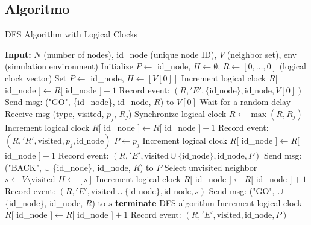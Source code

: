\subsection{Algoritmo}

\begin{algorithm}
\caption{DFS Algorithm with Logical Clocks}
\begin{algorithmic}[1]
    \State \textbf{Input:} $N$ (number of nodes), id\_node (unique node ID), $V$ (neighbor set), env (simulation environment)
    \State Initialize $P \leftarrow$ id\_node, $H \leftarrow \emptyset$, $R \leftarrow [0, \ldots, 0]$ (logical clock vector)
     
        \State Set $P \leftarrow$ id\_node, $H \leftarrow [V[0]]$
        \State Increment logical clock $R[$ id\_node $] \leftarrow R[$ id\_node $] + 1$
        \State Record event: $(R, 'E', \{ \text{id\_node} \}, \text{id\_node}, V[0])$
        \State Send msg: ("GO", \{id\_node\}, id\_node, $R$) to $V[0]$
    \EndIf
        \State Wait for a random delay
        \State Receive msg (type, visited, $p_j$, $R_j$)
        \State Synchronize logical clock $R \leftarrow \max(R, R_j)$
        \State Increment logical clock $R[$ id\_node $] \leftarrow R[$ id\_node $] + 1$
        \State Record event: $(R, 'R', \text{visited}, p_j, \text{id\_node})$
            \State $P \leftarrow p_j$
                \State Increment logical clock $R[$ id\_node $] \leftarrow R[$ id\_node $] + 1$
                \State Record event: $(R, 'E', \text{visited} \cup \{\text{id\_node}\}, \text{id\_node}, P)$
                \State Send msg: ("BACK",  $\cup$ \{id\_node\}, id\_node, $R$) to $P$
            \Else
                \State Select unvisited neighbor $s \leftarrow V \setminus \text{visited}$
                \State $H \leftarrow [s]$
                \State Increment logical clock $R[$ id\_node $] \leftarrow R[$ id\_node $] + 1$
                \State Record event: $(R, 'E', \text{visited} \cup \{\text{id\_node}\}, \text{id\_node}, s)$
                \State Send msg: ("GO",  $\cup$ \{id\_node\}, id\_node, $R$) to $s$
            \EndIf
         
                    \State \textbf{terminate} DFS algorithm
                \Else
                    \State Increment logical clock $R[$ id\_node $] \leftarrow R[$ id\_node $] + 1$
                    \State Record event: $(R, 'E', \text{visited}, \text{id\_node}, P)$

\end{algorithmic}
\end{algorithm}
